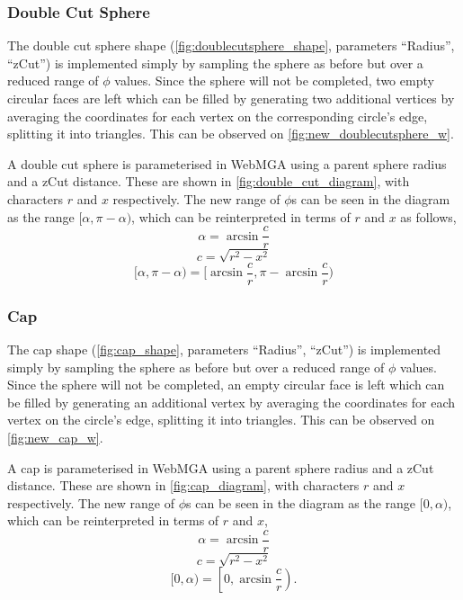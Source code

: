 
\subsubsection{Double Cut Sphere}
The double cut sphere shape (\cref{fig:doublecutsphere_shape}, parameters ``Radius'', ``zCut'') is implemented simply by sampling the sphere as before but over a reduced range of $\phi$ values. Since the sphere will not be completed, two empty circular faces are left which can be filled by generating two additional vertices by averaging the coordinates for each vertex on the corresponding circle's edge, splitting it into triangles. This can be observed on \cref{fig:new_doublecutsphere_w}.

A double cut sphere is parameterised in WebMGA using a parent sphere radius and a zCut distance. These are shown in \cref{fig:double_cut_diagram}, with characters $r$ and $x$ respectively. The new range of $\phi$s can be seen in the diagram as the range $[\alpha,\pi-\alpha)$, which can be reinterpreted in terms of $r$ and $x$ as follows,
\begin{equation}
\alpha=\arcsin\frac{c}{r}
\end{equation}
\begin{equation}
c=\sqrt{r^2-x^2}
\end{equation}
\begin{equation}
[\alpha,\pi-\alpha)=[\arcsin\frac{c}{r},\pi - \arcsin\frac{c}{r})
\end{equation}

\subsubsection{Cap}
\label{cap_section}
The cap shape (\cref{fig:cap_shape}, parameters ``Radius'', ``zCut'') is implemented simply by sampling the sphere as before but over a reduced range of $\phi$ values. Since the sphere will not be completed, an empty circular face is left which can be filled by generating an additional vertex by averaging the coordinates for each vertex on the circle's edge, splitting it into triangles. This can be observed on \cref{fig:new_cap_w}.

A cap is parameterised in WebMGA using a parent sphere radius and a zCut distance. These are shown in \cref{fig:cap_diagram}, with characters $r$ and $x$ respectively. The new range of $\phi$s can be seen in the diagram as the range $[0,\alpha)$, which can be reinterpreted in terms of $r$ and $x$,
\begin{equation}
\alpha=\arcsin\frac{c}{r}
\end{equation}
\begin{equation}
c=\sqrt{r^2-x^2}
\end{equation}
\begin{equation}
[0, \alpha)=\left[ 0, \arcsin\frac{c}{r} \right).
\end{equation}

